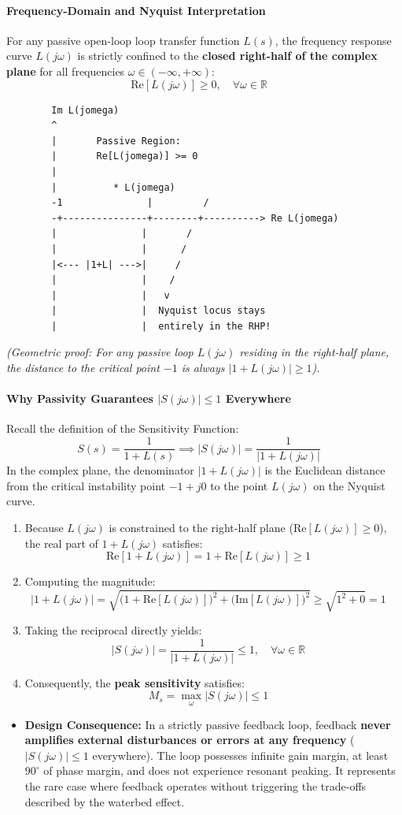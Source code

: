 \documentclass[12pt,onecolumn,twoside ]{article}
\begin{document}
	\paragraph{Frequency-Domain and Nyquist Interpretation}
	For any passive open-loop loop transfer function $L(s)$, the frequency response curve $L(j\omega)$ is strictly confined to the \textbf{closed right-half of the complex plane} for all frequencies $\omega \in (-\infty, +\infty)$: \[
	\text{Re}[L(j\omega)] \ge 0, \quad \forall \omega \in \mathbb{R} \quad
	\]
	\begin{lstlisting}
		Im L(jomega)
		^
		|       Passive Region:
		|       Re[L(jomega)] >= 0
		|
		|          * L(jomega)
		-1               |         /
		-+---------------+--------+----------> Re L(jomega)
		|               |       /
		|               |      /
		|<--- |1+L| --->|     /
		|               |    /
		|               |   v
		|               |  Nyquist locus stays
		|               |  entirely in the RHP!
	\end{lstlisting}
	\textit{(Geometric proof: For any passive loop $L(j\omega)$ residing in the right-half plane, the distance to the critical point $-1$ is always $|1 + L(j\omega)| \ge 1$).}
	\paragraph{Why Passivity Guarantees $|S(j\omega)| \le 1$ Everywhere}
	Recall the definition of the Sensitivity Function: \[
	S(s) = \frac{1}{1 + L(s)} \implies |S(j\omega)| = \frac{1}{|1 + L(j\omega)|} \quad
	\] In the complex plane, the denominator $|1 + L(j\omega)|$ is the Euclidean distance from the critical instability point $-1 + j0$ to the point $L(j\omega)$ on the Nyquist curve.
	\begin{enumerate}
		\item
		Because $L(j\omega)$ is constrained to the right-half plane ($\text{Re}[L(j\omega)] \ge 0$), the real part of $1 + L(j\omega)$ satisfies: \[
		\text{Re}[1 + L(j\omega)] = 1 + \text{Re}[L(j\omega)] \ge 1 \quad
		\]
		\item
		Computing the magnitude: \[
		|1 + L(j\omega)| = \sqrt{\big(1 + \text{Re}[L(j\omega)]\big)^2 + \big(\text{Im}[L(j\omega)]\big)^2} \ge \sqrt{1^2 + 0} = 1 \quad
		\]
		\item
		Taking the reciprocal directly yields: \[
		|S(j\omega)| = \frac{1}{|1 + L(j\omega)|} \le 1, \quad \forall \omega \in \mathbb{R} \quad
		\]
		\item
		Consequently, the \textbf{peak sensitivity} satisfies: \[
		M_s = \max_{\omega} |S(j\omega)| \le 1 \quad
		\]
	\end{enumerate}
	\begin{itemize}
		\item
		\textbf{Design Consequence:} In a strictly passive feedback loop, feedback \textbf{never amplifies external disturbances or errors at any frequency} ($|S(j\omega)| \le 1$ everywhere). The loop possesses infinite gain margin, at least $90^\circ$ of phase margin, and does not experience resonant peaking. It represents the rare case where feedback operates without triggering the trade-offs described by the waterbed effect.
	\end{itemize}
	
\end{document}
